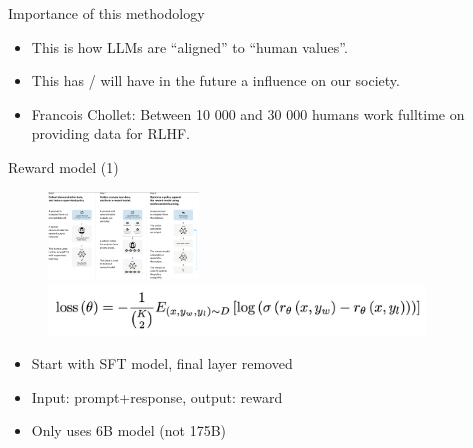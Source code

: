 \begin{vbframe}{Importance of this methodology}




	\begin{itemize}
\item This is how LLMs are ``aligned'' to ``human values''.
\item This has / will have in the future a  influence
on our society.
\item Francois Chollet: Between 10 000 and 30 000 humans
work fulltime on providing data for RLHF.
	\end{itemize}



\end{vbframe}





\begin{vbframe}{Reward model (1)}


\begin{figure}
\centering
\includegraphics[width = 4cm]{figure/threesteps.png}\\
\includegraphics[width = 10cm]{figure/rewardloss.png}
\end{figure}


\begin{itemize}
	\item Start with SFT model, final layer removed
        	\item Input: prompt+response, output: reward
        \item Only uses 6B model (not 175B)
\end{itemize}

\vfill

\end{vbframe}


